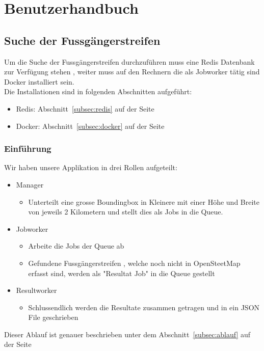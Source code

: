 \section{Benutzerhandbuch}
\subsection{Suche der Fussgängerstreifen}
Um die Suche der Fussgängerstreifen durchzuführen muss eine Redis Datenbank zur Verfügung stehen , weiter muss auf den Rechnern die als Jobworker tätig sind Docker installiert sein. \\
Die Installationen sind in folgenden Abschnitten aufgeführt:
\begin{itemize}
	\item Redis:  Abschnitt~\ref{subsec:redis} auf der Seite~\pageref{subsec:redis}
	\item Docker: Abschnitt~\ref{subsec:docker} auf der Seite~\pageref{subsec:docker}
\end{itemize}

\subsubsection{Einführung}
Wir haben unsere Applikation in drei Rollen aufgeteilt:
\begin{itemize}
	\item Manager
	\begin{itemize}
		\item Unterteilt eine grosse Boundingbox in Kleinere mit einer Höhe und Breite von jeweils 2 Kilometern und stellt dies als Jobs in die Queue.
	\end{itemize}
	\item Jobworker
	\begin{itemize}
		\item Arbeite die Jobs der Queue ab
		\item Gefundene Fussgängerstreifen , welche noch nicht in OpenSteetMap erfasst sind, werden als "Resultat Job" in die Queue gestellt
	\end{itemize}
	\item Resultworker
	\begin{itemize}
		\item Schlussendlich werden die Resultate zusammen getragen und in ein JSON File geschrieben
	\end{itemize}
\end{itemize}

Dieser Ablauf ist genauer beschrieben unter dem Abschnitt~\ref{subsec:ablauf} auf der Seite~\pageref{subsec:ablauf}

